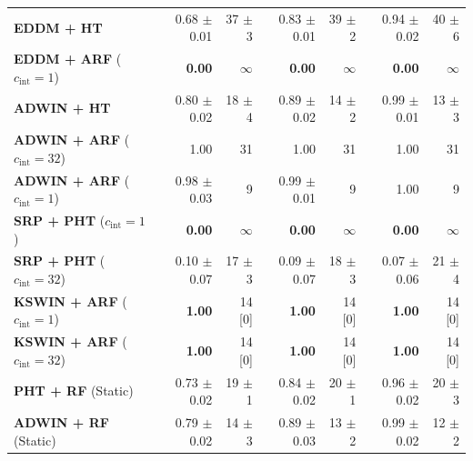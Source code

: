 \begin{table}[t]
{\begin{tabular}{@{}lrrrrrr@{}}
    \midrule
    \textbf{EDDM + HT}                             & 0.68 {\small $\pm$0.01} & 37 {\small $\pm$3} & 0.83 {\small $\pm$0.01} & 39 {\small $\pm$2} & 0.94 {\small $\pm$0.02} & 40 {\small $\pm$6} \\
    \textbf{EDDM + ARF} ($c_{\mathrm{int}} = 1$)   & \textbf{0.00} & $\infty$ & \textbf{0.00} & $\infty$ & \textbf{0.00} & $\infty$ \\
    \midrule
    \textbf{ADWIN + HT}                            & 0.80 {\small $\pm$0.02} & 18 {\small $\pm$4} & 0.89 {\small $\pm$0.02} & 14 {\small $\pm$2} & 0.99 {\small $\pm$0.01} & 13 {\small $\pm$3} \\
    \textbf{ADWIN + ARF} ($c_{\mathrm{int}} = 32$) & 1.00 & 31 & 1.00 & 31 & 1.00 & 31 \\
    \textbf{ADWIN + ARF} ($c_{\mathrm{int}} = 1$)  & 0.98 {\small $\pm$0.03} & 9 & 0.99 {\small $\pm$0.01} & 9 & 1.00 & 9 \\
    \midrule
    \textbf{SRP + PHT} ($c_{\mathrm{int}} = 1$)    & \textbf{0.00} & $\infty$ & \textbf{0.00} & $\infty$ & \textbf{0.00} & $\infty$ \\
    \textbf{SRP + PHT} ($c_{\mathrm{int}} = 32$)   & 0.10 {\small $\pm$0.07} & 17 {\small $\pm$3} & 0.09 {\small $\pm$0.07} & 18 {\small $\pm$3} & 0.07 {\small $\pm$0.06} & 21 {\small $\pm$4} \\
    \textbf{KSWIN + ARF} ($c_{\mathrm{int}} = 1$)  & \textbf{1.00} & 14 [0] & \textbf{1.00} & 14 [0] & \textbf{1.00} & 14 [0] \\
    \textbf{KSWIN + ARF} ($c_{\mathrm{int}} = 32$) & \textbf{1.00} & 14 [0] & \textbf{1.00} & 14 [0] & \textbf{1.00} & 14 [0] \\
    \midrule
    \textbf{PHT + RF} (Static)                     & 0.73 {\small $\pm$0.02} & 19 {\small $\pm$1} & 0.84 {\small $\pm$0.02} & 20 {\small $\pm$1} & 0.96 {\small $\pm$0.02} & 20 {\small $\pm$3} \\
    \textbf{ADWIN + RF} (Static)                   & 0.79 {\small $\pm$0.02} & 14 {\small $\pm$3} & 0.89 {\small $\pm$0.03} & 13 {\small $\pm$2} & 0.99 {\small $\pm$0.02} & 12 {\small $\pm$2} \\
    \bottomrule
  \end{tabular}}
\end{table}
